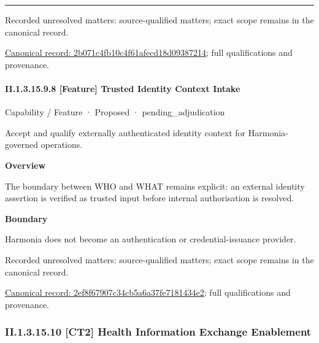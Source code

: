 \medskip\hrule\medskip

{\small Recorded unresolved matters: source-qualified matters; exact scope remains in the canonical record.}\par
{\footnotesize \href{../../../../continuum/strategy/capability/feature/2b071c4fb10c4f61afecd18d09387214.md}{Canonical record: 2b071c4fb10c4f61afecd18d09387214}; full qualifications and provenance.}\par
\paragraph*{II.1.3.15.9.8 [Feature] Trusted Identity Context Intake}
\label{navigation:II.1.3.15.9.8}

\label{element:2ef8f67907c34cb5a6a37fe7181434e2}
{\small Capability / Feature · Proposed · pending\_adjudication}\par

Accept and qualify externally authenticated identity context for Harmonia-governed operations.



\textbf{Overview}



The boundary between WHO and WHAT remains explicit: an external identity assertion is verified as trusted input before internal authorisation is resolved.



\textbf{Boundary}



Harmonia does not become an authentication or credential-issuance provider.


{\small Recorded unresolved matters: source-qualified matters; exact scope remains in the canonical record.}\par
{\footnotesize \href{../../../../continuum/strategy/capability/feature/2ef8f67907c34cb5a6a37fe7181434e2.md}{Canonical record: 2ef8f67907c34cb5a6a37fe7181434e2}; full qualifications and provenance.}\par
\subsubsection*{II.1.3.15.10 [CT2] Health Information Exchange Enablement}
\label{navigation:II.1.3.15.10}

